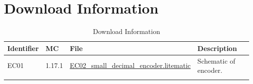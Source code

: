\documentclass[10pt]{datasheet}
\begin{document}
\section{Download Information}
\begin{table}[h]
    \caption{Download Information}
    \begin{tabularx}{\textwidth}{l | l | l | X}
        \thickhline
        \textbf{Identifier} & \textbf{MC} & \textbf{File} & \textbf{Description} \\
        \hline
        EC01 & 1.17.1 & \href{https://github.com/Soontech-Annals/Archive/blob/92d3541e07ddc3ab90360e923907f040eca76834/Archive/encoders/EC02\%20Small\%20Decimal\%20Encoder/EC02\_small\_decimal\_encoder.litematic?raw=1}{EC02\_small\_decimal\_encoder.litematic} & Schematic of encoder. \\
        \hline
        \thickhline
    \end{tabularx}
\end{table}
\end{document}
